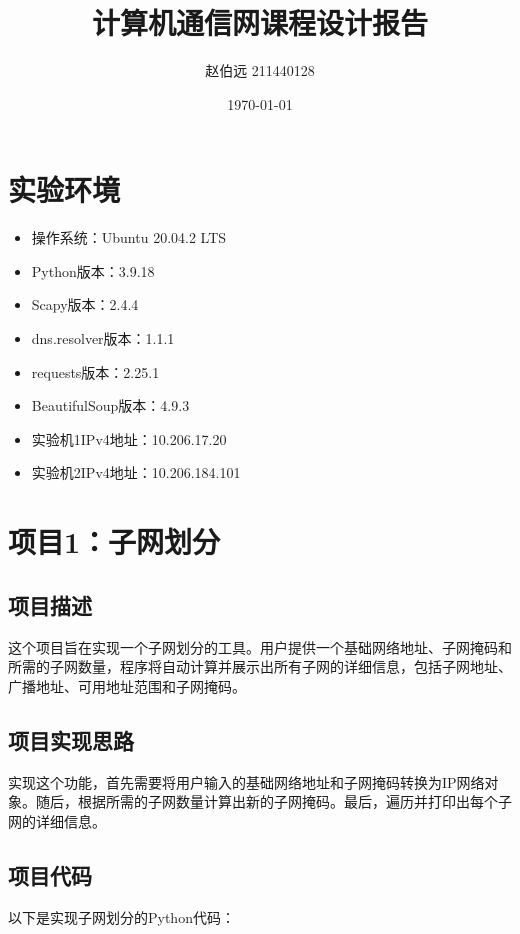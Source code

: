 \documentclass[UTF8,titlepage]{ctexart}
\numberwithin{figure}{section}
\begin{document}
\title{计算机通信网课程设计报告}
\author{赵伯远 211440128}
\date{\today}
\maketitle
\tableofcontents
\clearpage
\section{实验环境}
\begin{itemize}
    \item 操作系统：Ubuntu 20.04.2 LTS
    \item Python版本：3.9.18
    \item Scapy版本：2.4.4
    \item dns.resolver版本：1.1.1
    \item requests版本：2.25.1
    \item BeautifulSoup版本：4.9.3
    \item 实验机1IPv4地址：10.206.17.20
    \item 实验机2IPv4地址：10.206.184.101
\end{itemize}
\section{项目1：子网划分}
\subsection{项目描述}
这个项目旨在实现一个子网划分的工具。用户提供一个基础网络地址、子网掩码和所需的子网数量，程序将自动计算并展示出所有子网的详细信息，包括子网地址、广播地址、可用地址范围和子网掩码。

\subsection{项目实现思路}
实现这个功能，首先需要将用户输入的基础网络地址和子网掩码转换为IP网络对象。随后，根据所需的子网数量计算出新的子网掩码。最后，遍历并打印出每个子网的详细信息。

\subsection{项目代码}
以下是实现子网划分的Python代码：
\end{document}
